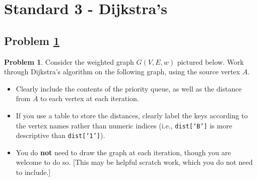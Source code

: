 \documentclass[11pt]{article}
\theoremstyle{definition}
\theoremstyle{definition}
\newtheorem{required}{Problem}
\theoremstyle{definition}
\begin{document}
\newpage
\section{Standard 3 - Dijkstra's}

\subsection{Problem \ref{Dijkstra1}}
\begin{required} \label{Dijkstra1}
Consider the weighted graph $G(V, E, w)$ pictured below. Work through Dijkstra's algorithm on the following graph, using the source vertex $A$. 
\begin{itemize}
\item Clearly include the contents of the priority queue, as well as the distance from $A$ to each vertex at each iteration.
\item If you use a table to store the distances, clearly label the keys according to the vertex names rather than numeric indices (i.e., \texttt{dist[`B']} is more descriptive than \texttt{dist[`1']}).
\item You do \textbf{not} need to draw the graph at each iteration, though you are welcome to do so. [This may be helpful scratch work, which you do not need to include.]
\end{itemize}

\begin{center}
\end{center}


\end{required}
\end{document}
